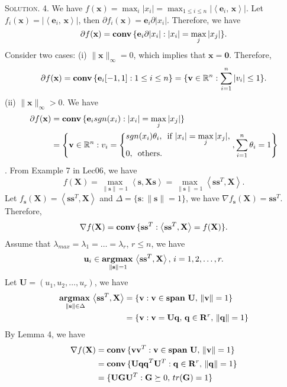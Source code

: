 \documentclass[12pt, a4paper, oneside]{ctexart}
\newenvironment{solution}{\par\noindent\textsc{Solution. }}{\\\par}
\DeclareMathOperator*{\conv}{\bf conv\,}
\DeclareMathOperator*{\argmax}{\bf argmax\,}
\DeclareMathOperator*{\mspan}{\bf span\,}
\begin{document}
\begin{solution}
	4. We have $f(\mathbf{x}) = \max_i |x_i| = \max_{1 \leq i \leq n} | \left\langle \mathbf{e}_i,\, \mathbf{x} \right\rangle |$. Let $f_i(\mathbf{x}) = | \left\langle \mathbf{e}_i,\, \mathbf{x} \right\rangle |$, then $\partial f_i(\mathbf{x}) = \mathbf{e}_i \partial |x_i|$. Therefore, we have 
	\[
	\partial f(\mathbf{x}) = \conv \{\mathbf{e}_i \partial |x_i| : |x_i| = \max_j |x_j|\}.
	\]
	Consider two cases: \newline
	(i) $\|\mathbf{x}\|_\infty = 0$, which implies that $\mathbf{x} = \mathbf{0}$. Therefore, 
	\[
	\partial f(\mathbf{x}) = \conv \{\mathbf{e}_i [-1, 1] : 1 \leq i \leq n\} = \{\mathbf{v} \in \mathbb{R}^n : \sum_{i = 1}^{n} | v_i | \leq 1\}.
	\]
	(ii) $\|\mathbf{x}\|_\infty > 0$. We have
	\begin{align*}
		\partial f(\mathbf{x}) & = \conv \{\mathbf{e}_i sgn(x_i) : |x_i| = \max_j |x_j|\} \\ 
		& = \left\lbrace \mathbf{v} \in \mathbb{R}^n : v_i = \left\lbrace
			\begin{aligned}
				& sgn(x_i) \theta_i,\, \text{ if } |x_i| = \max_j |x_j|, \\
				& 0,\, \text{ others. }
			\end{aligned}
			\right. , \sum_{i = 1}^{n} \theta_i = 1
			\right\rbrace
	\end{align*}
	. From Example 7 in Lec06, we have
	\[
	f(\mathbf{X}) = \max\limits_{\|\mathbf{s}\| = 1} \left\langle \mathbf{s}, \mathbf{Xs} \right\rangle = \max\limits_{\|\mathbf{s}\| = 1} \left\langle \mathbf{ss}^T, \mathbf{X}\right\rangle.
	\]
	Let $f_\mathbf{s}(\mathbf{X}) = \left\langle \mathbf{ss}^T, \mathbf{X} \right\rangle$ and $\Delta = \{\mathbf{s} : \|\mathbf{s}\| = 1\}$, we have $\nabla f_\mathbf{s}(\mathbf{X}) = \mathbf{ss}^T$. Therefore, 
	\[
	\nabla f(\mathbf{X}) = \conv \{ \mathbf{ss}^T : \left\langle \mathbf{ss}^T, \mathbf{X} \right\rangle = f(\mathbf{X})\}. 	
	\]
	Assume that $\lambda_{max} = \lambda_1 = \dots = \lambda_r$, $r \leq n$, we have
	\[
	\mathbf{u}_i \in \argmax\limits_{\|\mathbf{s}\| = 1} \left\langle \mathbf{ss}^T, \mathbf{X} \right\rangle,\, i = 1, 2, \dots, r.
	\]
	Let $\mathbf{U} = (u_1, u_2, \dots, u_r)$, we have
	\begin{align*}
		\argmax\limits_{\|\mathbf{s}\| \in \Delta} \left\langle \mathbf{ss}^T, \mathbf{X} \right\rangle & = \{\mathbf{v} : \mathbf{v} \in \mspan \mathbf{U},\, \|\mathbf{v}\| = 1\} \\
		& = \{\mathbf{v} : \mathbf{v} = \mathbf{Uq},\, \mathbf{q} \in \mathbf{R}^r,\, \|\mathbf{q}\| = 1\}
	\end{align*}
	By Lemma 4, we have
	\begin{align*}
		\nabla f(\mathbf{X}) & = \conv \{\mathbf{vv}^T : \mathbf{v} \in \mspan \mathbf{U},\, \|\mathbf{v}\| = 1\} \\
		& = \conv \{\mathbf{Uqq}^T \mathbf{U}^T : \mathbf{q} \in \mathbf{R}^r,\, \|\mathbf{q}\| = 1\} \\
		& = \{\mathbf{UGU}^T : \mathbf{G} \succeq 0,\, tr(\mathbf{G}) = 1\}
	\end{align*}
\end{solution}
\end{document}
